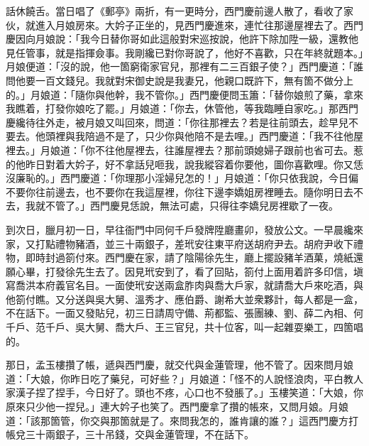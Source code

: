 話休饒舌。當日唱了《郵亭》兩折，有一更時分，西門慶前邊人散了，看收了家伙，就進入月娘房來。大妗子正坐的，見西門慶進來，連忙往那邊屋裡去了。西門慶因向月娘說：「我今日替你哥如此這般對宋巡按說，他許下除加陞一級，還教他見任管事，就是指揮僉事。我剛纔已對你哥說了，他好不喜歡，只在年終就題本。」月娘便道：「沒的說，他一箇窮衛家官兒，那裡有二三百銀子使？」西門慶道：「誰問他要一百文錢兒。我就對宋御史說是我妻兄，他親口既許下，無有箇不做分上的。」月娘道：「隨你與他幹，我不管你。」西門慶便問玉簫：「替你娘煎了藥，拿來我瞧着，打發你娘吃了罷。」月娘道：「你去，休管他，等我臨睡自家吃。」那西門慶纔待往外走，被月娘又叫回來，問道：「你往那裡去？若是往前頭去，趁早兒不要去。他頭裡與我陪過不是了，只少你與他陪不是去哩。」{}西門慶道：「我不往他屋裡去。」月娘道：「你不往他屋裡去，往誰屋裡去？那前頭媳婦子跟前也省可去。惹的他昨日對着大妗子，好不拿話兒咂我，說我縱容着你要他，圖你喜歡哩。你又恁沒廉恥的。」西門慶道：「你理那小淫婦兒怎的！」{}月娘道：「你只依我說，今日偏不要你往前邊去，也不要你在我這屋裡，你往下邊李嬌姐房裡睡去。隨你明日去不去，我就不管了。」西門慶見恁說，無法可處，只得往李嬌兒房裡歇了一夜。

到次日，臘月初一日，早往衙門中同何千戶發牌陞廳畫卯，發放公文。一早晨纔來家，又打點禮物豬酒，並三十兩銀子，差玳安往東平府送胡府尹去。胡府尹收下禮物，即時封過箚付來。西門慶在家，請了陰陽徐先生，廳上擺設豬羊酒菓，燒紙還願心畢，打發徐先生去了。因見玳安到了，看了回貼，箚付上面用着許多印信，塡寫喬洪本府義官名目。一面使玳安送兩盒胙肉與喬大戶家，就請喬大戶來吃酒，與他箚付瞧。又分送與吳大舅、溫秀才、應伯爵、謝希大並衆夥計，每人都是一盒，不在話下。一面又發貼兒，初三日請周守備、荊都監、張團練、劉、薛二內相、何千戶、范千戶、吳大舅、喬大戶、王三官兒，共十位客，叫一起雜耍樂工，四箇唱的。

那日，孟玉樓攢了帳，遞與西門慶，就交代與金蓮管理，他不管了。因來問月娘道：「大娘，你昨日吃了藥兒，可好些？」月娘道：「怪不的人說怪浪肉，平白教人家漢子捏了捏手，今日好了。{}頭也不疼，心口也不發脹了。」玉樓笑道：「大娘，你原來只少他一捏兒。」連大妗子也笑了。西門慶拿了攢的帳來，又問月娘。月娘道：「該那箇管，你交與那箇就是了。來問我怎的，誰肯讓的誰？」{}這西門慶方打帳兌三十兩銀子，三十吊錢，交與金蓮管理，不在話下。

